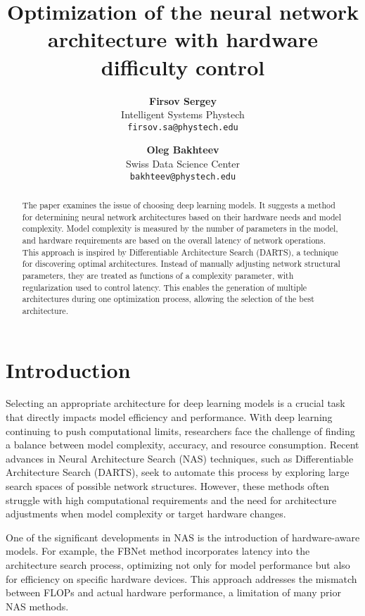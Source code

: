 \documentclass{article}
\title{Optimization of the neural network architecture with hardware difficulty control}
\author{ \textbf{Firsov Sergey} \\
        Intelligent Systems Phystech\\
	\texttt{firsov.sa@phystech.edu} \\
	\and
	\textbf{Oleg Bakhteev}  \\
	Swiss Data Science Center\\
	\texttt{bakhteev@phystech.edu} \\
}
\date{}
\begin{document}
\maketitle

\begin{abstract}
    The paper examines the issue of choosing deep learning models. It suggests a method for determining neural network architectures based on their hardware needs and model complexity. Model complexity is measured by the number of parameters in the model, and hardware requirements are based on the overall latency of network operations.
    This approach is inspired by Differentiable Architecture Search (DARTS), a technique for discovering optimal architectures. Instead of manually adjusting network structural parameters, they are treated as functions of a complexity parameter, with regularization used to control latency. This enables the generation of multiple architectures during one optimization process, allowing the selection of the best architecture.


\end{abstract}



\section{Introduction}
Selecting an appropriate architecture for deep learning models is a crucial task that directly impacts model efficiency and performance. With deep learning continuing to push computational limits, researchers face the challenge of finding a balance between model complexity, accuracy, and resource consumption. Recent advances in Neural Architecture Search (NAS) techniques, such as Differentiable Architecture Search (DARTS), seek to automate this process by exploring large search spaces of possible network structures. However, these methods often struggle with high computational requirements and the need for architecture adjustments when model complexity or target hardware changes\cite{yakovlev2021neural}.

One of the significant developments in NAS is the introduction of hardware-aware models. For example, the FBNet method \cite{Wu_2019_CVPR} incorporates latency into the architecture search process, optimizing not only for model performance but also for efficiency on specific hardware devices. This approach addresses the mismatch between FLOPs and actual hardware performance, a limitation of many prior NAS methods. %
\end{document}
